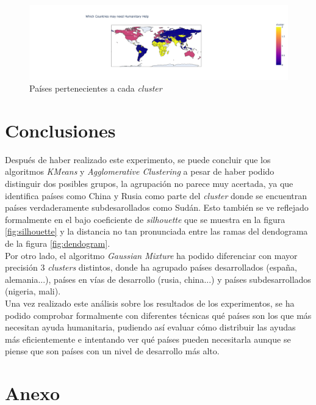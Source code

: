 \documentclass{article}
\begin{document}
\begin{figure}[H]
  \centering
  \includegraphics[width=\linewidth]{../images/gaussian/map.png}
  \caption{Países pertenecientes a cada \textit{cluster}}
  \label{fig:gaussian-map}
\end{figure}

\section{Conclusiones}

\noindent Después de haber realizado este experimento, se puede concluir que los algoritmos \textit{KMeans} y \textit{Agglomerative Clustering} a pesar de haber podido distinguir dos posibles grupos, la agrupación no parece muy acertada, ya que identifica países como China y Rusia como parte del \textit{cluster} donde se encuentran países verdaderamente subdesarollados como Sudán.
Esto también se ve reflejado formalmente en el bajo coeficiente de \textit{silhouette} que se muestra en la figura \ref{fig:silhouette} y la distancia no tan pronunciada entre las ramas del dendograma de la figura \ref{fig:dendogram}.\\

\noindent Por otro lado, el algoritmo \textit{Gaussian Mixture} ha podido diferenciar con mayor precisión 3 \textit{clusters} distintos, donde ha agrupado países desarrollados (españa, alemania...), países en vías de desarrollo (rusia, china...) y países subdesarrollados (nigeria, mali). \\

\noindent Una vez realizado este análisis sobre los resultados de los experimentos, se ha podido comprobar formalmente con diferentes técnicas qué países son los que más necesitan ayuda humanitaria, pudiendo así evaluar cómo distribuir las ayudas más eficientemente e intentando ver qué países pueden necesitarla aunque se piense que son países con un nivel de desarrollo más alto.

\printbibliography

\section*{Anexo}
\end{document}
